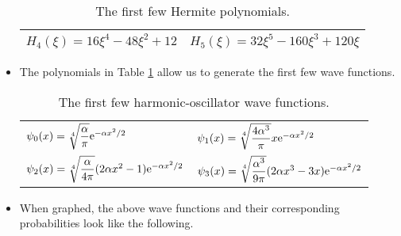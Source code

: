 \documentclass[../notes.tex]{subfiles}
\begin{document}
\begin{itemize}
\begin{table}[h!]
\begin{tabular}{ll}
            $H_4(\xi)=16\xi^4-48\xi^2+12$ & $H_5(\xi)=32\xi^5-160\xi^3+120\xi$\\
            \bottomrule
        \end{tabular}
        \caption{The first few Hermite polynomials.}
        \label{tab:hermitePolynomials}
    \end{table}
    \item The polynomials in Table \ref{tab:hermitePolynomials} allow us to generate the first few wave functions.
    \begin{table}[h!]
        \centering
        \small
        \renewcommand{\arraystretch}{1.6}
        \begin{tabular}{ll}
            \toprule
            $\psi_0(x)=\sqrt[4]{\dfrac{\alpha}{\pi}}\e[-\alpha x^2/2]$ & $\psi_1(x)=\sqrt[4]{\dfrac{4\alpha^3}{\pi}}x\e[-\alpha x^2/2]$\\
            $\psi_2(x)=\sqrt[4]{\dfrac{\alpha}{4\pi}}(2\alpha x^2-1)\e[-\alpha x^2/2]$ & $\psi_3(x)=\sqrt[4]{\dfrac{\alpha^3}{9\pi}}(2\alpha x^3-3x)\e[-\alpha x^2/2]$\\
            \bottomrule
        \end{tabular}
        \caption{The first few harmonic-oscillator wave functions.}
        \label{tab:harmonicWaveFunction}
    \end{table}
    \item When graphed, the above wave functions and their corresponding probabilities look like the following.
    \begin{figure}[h!]
        \centering
\end{figure}
\end{itemize}
\end{document}
